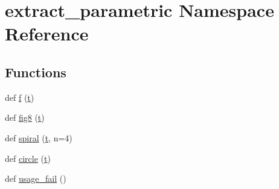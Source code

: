 \hypertarget{namespaceextract__parametric}{}\section{extract\+\_\+parametric Namespace Reference}
\label{namespaceextract__parametric}
\subsection*{Functions}
\begin{DoxyCompactItemize}
\item 
def \hyperlink{namespaceextract__parametric_a1b3d46b1d3f50aea355472de9ccff6b6}{f} (\hyperlink{namespaceextract__parametric_a730b851f64e77467557fbc820239405a}{t})
\item 
def \hyperlink{namespaceextract__parametric_ac0b8fb89e267229597be31a581bed247}{fig8} (\hyperlink{namespaceextract__parametric_a730b851f64e77467557fbc820239405a}{t})
\item 
def \hyperlink{namespaceextract__parametric_a229310fc0ffe5974a869a3cc37a45c2f}{spiral} (\hyperlink{namespaceextract__parametric_a730b851f64e77467557fbc820239405a}{t}, n=4)
\item 
def \hyperlink{namespaceextract__parametric_ab09e962b23175c33ce7cfe2cd25dc7cd}{circle} (\hyperlink{namespaceextract__parametric_a730b851f64e77467557fbc820239405a}{t})
\item 
def \hyperlink{namespaceextract__parametric_a5f451daddc29d4fc71f0f052868a62d4}{usage\+\_\+fail} ()
\end{DoxyCompactItemize}
